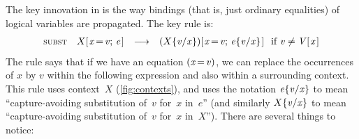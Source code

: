 \documentclass[acmsmall]{acmart}
\newcommand{\Conid}[1]{\mathit{#1}}
\newcommand{\Varid}[1]{\mathit{#1}}
\begin{document}

The key innovation in \versecalc{} is the way bindings (that is, just ordinary equalities)
of logical variables are propagated.
The key rule is:
$$
\begin{array}{rrcll}
  \rulename{subst} & \ensuremath{X [\mskip1.5mu \Varid{x}\hspace{-0.14em}=\hspace{-0.14em}\Varid{v};\,\Varid{e}\mskip1.5mu]} & \movesto & \ensuremath{(\subst{X}{\Varid{x}}{\Varid{v}}) [\mskip1.5mu \Varid{x}\hspace{-0.14em}=\hspace{-0.14em}\Varid{v};\,\subst{\Varid{e}}{\Varid{x}}{\Varid{v}}\mskip1.5mu]} \hspace*{-0.3em}
  & \text{if $\ensuremath{\Varid{v}} \not= \ensuremath{\Conid{V} [\mskip1.5mu \Varid{x}\mskip1.5mu]}$} \\
\end{array}
$$
The rule says that if we have an equation \ensuremath{(\Varid{x}\hspace{-0.14em}=\hspace{-0.14em}\Varid{v})},
we can replace the occurrences of \ensuremath{\Varid{x}} by \ensuremath{\Varid{v}} within the following expression and also within a surrounding context.
This rule uses context~\ensuremath{X} (\cref{fig:contexts}), and
uses the notation \ensuremath{\subst{\Varid{e}}{\Varid{x}}{\Varid{v}}} to mean ``capture-avoiding substitution of~\ensuremath{\Varid{v}} for~\ensuremath{\Varid{x}} in~\ensuremath{\Varid{e}}''
(and similarly \ensuremath{\subst{X}{\Varid{x}}{\Varid{v}}} to mean ``capture-avoiding substitution of~\ensuremath{\Varid{v}} for~\ensuremath{\Varid{x}} in~\ensuremath{X}'').
There are several things to notice:
\end{document}

